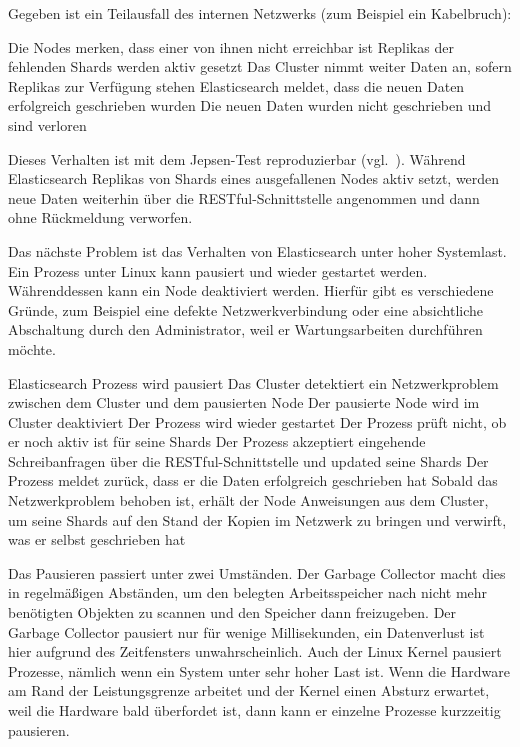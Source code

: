 Gegeben ist ein Teilausfall des internen Netzwerks (zum Beispiel ein
Kabelbruch):

\begin{outline}
  \1 Die Nodes merken, dass einer von ihnen nicht erreichbar ist
  \1 Replikas der fehlenden Shards werden aktiv gesetzt
  \1 Das Cluster nimmt weiter Daten an, sofern Replikas zur Verfügung stehen
  \1 Elasticsearch meldet, dass die neuen Daten erfolgreich geschrieben wurden
  \1 Die neuen Daten wurden nicht geschrieben und sind verloren
\end{outline}

Dieses Verhalten ist mit dem Jepsen-Test reproduzierbar
(vgl.~\cite{es_jepsen_iso}). Während Elasticsearch Replikas von Shards eines
ausgefallenen Nodes aktiv setzt, werden neue Daten weiterhin über die
RESTful-Schnittstelle angenommen und dann ohne Rückmeldung verworfen.

Das nächste Problem ist das Verhalten von Elasticsearch unter hoher Systemlast.
Ein Prozess unter Linux kann pausiert und wieder gestartet werden.
Währenddessen kann ein Node deaktiviert werden. Hierfür gibt es verschiedene
Gründe, zum Beispiel eine defekte Netzwerkverbindung oder eine absichtliche
Abschaltung durch den Administrator, weil er Wartungsarbeiten durchführen
möchte.

\begin{outline}
  \1 Elasticsearch Prozess wird pausiert
  \1 Das Cluster detektiert ein Netzwerkproblem zwischen dem Cluster und dem
  pausierten Node
  \1 Der pausierte Node wird im Cluster deaktiviert
  \1 Der Prozess wird wieder gestartet
  \1 Der Prozess prüft nicht, ob er noch aktiv ist für seine Shards
  \1 Der Prozess akzeptiert eingehende Schreibanfragen über die
  RESTful-Schnittstelle und updated seine Shards
  \1 Der Prozess meldet zurück, dass er die Daten erfolgreich geschrieben hat
  \1 Sobald das Netzwerkproblem behoben ist, erhält der Node Anweisungen aus
  dem Cluster, um seine Shards auf den Stand der Kopien im Netzwerk zu bringen
  und verwirft, was er selbst geschrieben hat
\end{outline}

Das Pausieren passiert unter zwei Umständen. Der \gls{Garbage Collector} macht
dies in regelmäßigen Abständen, um den belegten Arbeitsspeicher nach nicht mehr
benötigten Objekten zu scannen und den Speicher dann freizugeben. Der Garbage
Collector pausiert nur für wenige Millisekunden, ein Datenverlust ist hier
aufgrund des Zeitfensters unwahrscheinlich. Auch der Linux Kernel pausiert
Prozesse, nämlich wenn ein System unter sehr hoher Last ist. Wenn die Hardware
am Rand der Leistungsgrenze arbeitet und der Kernel einen Absturz erwartet,
weil die Hardware bald überfordet ist, dann kann er einzelne Prozesse
kurzzeitig pausieren.


